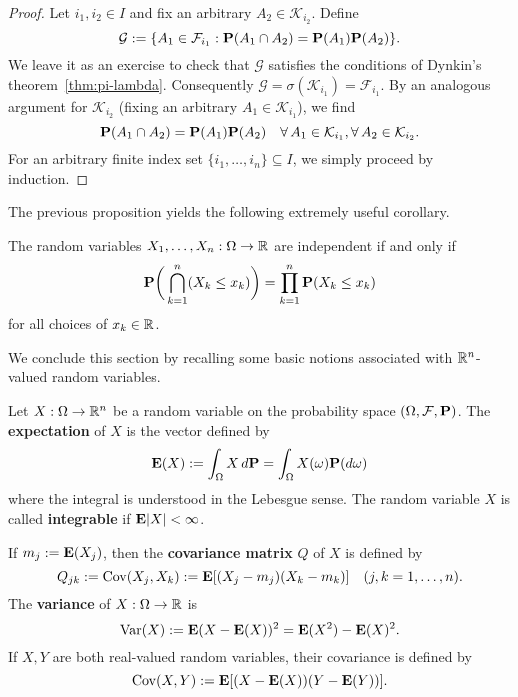 \begin{proof}
    Let $i_1,i_2\in I$ and fix an arbitrary $A_2\in\mathcal{K}_{i_2}$. Define
    \begin{equation*}
        \mathcal{G}:=\{A_1\in\mathcal{F}_{i_1} : \mathbf{P}(A_1\cap A_2)=\mathbf{P}(A_1)\mathbf{P}(A_2)\}.
    \end{equation*}
    We leave it as an exercise to check that $\mathcal{G}$ satisfies the conditions of Dynkin's theorem~\eqref{thm:pi-lambda}. Consequently $\mathcal{G}=\sigma(\mathcal{K}_{i_1})=\mathcal{F}_{i_1}$. By an analogous argument for $\mathcal{K}_{i_2}$ (fixing an arbitrary $A_1\in\mathcal{K}_{i_1}$), we find
    \begin{equation*}
        \mathbf{P}(A_1\cap A_2) = \mathbf{P}(A_1)\mathbf{P}(A_2) \quad\forall\, A_1\in\mathcal{K}_{i_1}, \forall\, A_2\in\mathcal{K}_{i_2}.
    \end{equation*}
    For an arbitrary finite index set $\{i_1,\ldots,i_n\}\subseteq I$, we simply proceed by induction.
\end{proof}

The previous proposition yields the following extremely useful corollary.
\begin{proposition}
    The random variables $X_1,\ldots, X_n:\Omega\to\mathbb{R}$ are independent if and only if
    \begin{equation}
        \mathbf{P}\bigg(\bigcap_{k=1}^n (X_k\le x_k)\bigg) = \prod_{k=1}^n \mathbf{P}(X_k\le x_k)
    \end{equation}
    for all choices of $x_k\in\mathbb{R}$.
\end{proposition}

We conclude this section by recalling some basic notions associated with $\mathbb{R}^n$-valued random variables.
\begin{definition}
    Let $X:\Omega\to\mathbb{R}^n$ be a random variable on the probability space $(\Omega,\mathcal{F},\mathbf{P})$. The \textbf{expectation} of $X$ is the vector defined by
    \begin{equation*}
        \mathbf{E}(X) := \int_\Omega X\,d\mathbf{P} = \int_\Omega X(\omega)\mathbf{P}(d\omega)
    \end{equation*}
    where the integral is understood in the Lebesgue sense. The random variable $X$ is called \textbf{integrable} if $\mathbf{E}|X|<\infty$.

    If $m_j := \mathbf{E}(X_j)$, then the \textbf{covariance matrix} $Q$ of $X$ is defined by
    \begin{equation*}
        Q_{jk} := \operatorname{Cov}(X_j,X_k) := \mathbf{E}[(X_j-m_j)(X_k-m_k)] \quad (j,k=1,\ldots, n).
    \end{equation*}
    The \textbf{variance} of $X:\Omega\to\mathbb{R}$ is
    \begin{equation*}
        \mathrm{Var}(X) := \mathbf{E}(X-\mathbf{E}(X))^2 = \mathbf{E}(X^2)-\mathbf{E}(X)^2.
    \end{equation*}
    If $X, Y$ are both real-valued random variables, their covariance is defined by
    \begin{equation*}
        \operatorname{Cov}(X,Y) := \mathbf{E}[(X-\mathbf{E}(X))(Y-\mathbf{E}(Y))].
    \end{equation*}
\end{definition}

